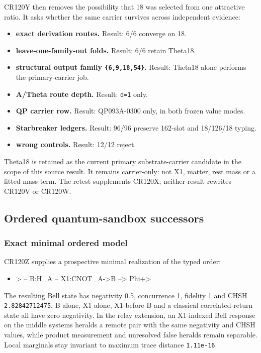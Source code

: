CR120Y then removes the possibility that 18 was selected from one
attractive ratio. It asks whether the same carrier survives across
independent evidence:

\begin{itemize}
\tightlist
\item
  \textbf{exact derivation routes.} Result: 6/6 converge on 18.
\item
  \textbf{leave-one-family-out folds.} Result: 6/6 retain Theta18.
\item
  \textbf{structural output family \texttt{\{6,9,18,54\}}.} Result:
  Theta18 alone performs the primary-carrier job.
\item
  \textbf{A/Theta route depth.} Result: \texttt{d=1} only.
\item
  \textbf{QP carrier row.} Result: QP093A-0300 only, in both frozen
  value modes.
\item
  \textbf{Starbreaker ledgers.} Result: 96/96 preserve 162-slot and
  18/126/18 typing.
\item
  \textbf{wrong controls.} Result: 12/12 reject.
\end{itemize}

Theta18 is retained as the current primary substrate-carrier candidate
in the scope of this source result. It remains carrier-only: not X1,
matter, rest mass or a fitted mass term. The retest supplements CR120X;
neither result rewrites CR120V or CR120W.

\subsection{Ordered quantum-sandbox
successors}\label{viii-ch05-ordered-quantum-sandbox-successors}

\subsubsection{Exact minimal ordered
model}\label{viii-ch05-exact-minimal-ordered-model}

CR120Z supplies a prospective minimal realization of the typed order:

\begin{itemize}
\tightlist
\item
  \textgreater{} -- B:H\_A -- X1:CNOT\_A-\textgreater B
  --\textgreater{} \textbar Phi+\textgreater{}
\end{itemize}

The resulting Bell state has negativity 0.5, concurrence 1, fidelity 1
and CHSH \texttt{2.82842712475}. B alone, X1 alone, X1-before-B and a
classical correlated-return state all have zero negativity. In the relay
extension, an X1-indexed Bell response on the middle systems heralds a
remote pair with the same negativity and CHSH values, while product
measurement and unresolved false heralds remain separable. Local
marginals stay invariant to maximum trace distance \texttt{1.11e-16}.

